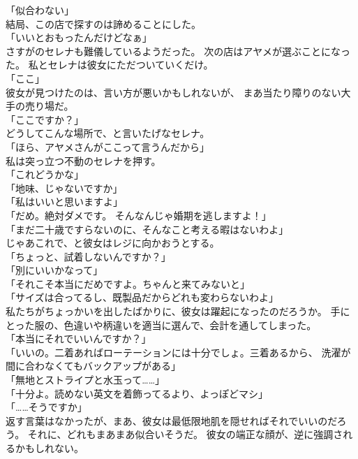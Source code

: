 \documentclass[../IHMain]{subfiles}
\begin{document}
「似合わない」\\
結局、この店で探すのは諦めることにした。\\
「いいとおもったんだけどなぁ」\\
さすがのセレナも難儀しているようだった。
次の店はアヤメが選ぶことになった。
私とセレナは彼女にただついていくだけ。\\
「ここ」\\
彼女が見つけたのは、言い方が悪いかもしれないが、
まあ当たり障りのない大手の売り場だ。\\
「ここですか？」\\
どうしてこんな場所で、と言いたげなセレナ。\\
「ほら、アヤメさんがここって言うんだから」\\
私は突っ立つ不動のセレナを押す。\\
「これどうかな」\\
「地味、じゃないですか」\\
「私はいいと思いますよ」\\
「だめ。絶対ダメです。
そんなんじゃ婚期を逃しますよ！」\\
「まだ二十歳ですらないのに、そんなこと考える暇はないわよ」\\
じゃあこれで、と彼女はレジに向かおうとする。\\
「ちょっと、試着しないんですか？」\\
「別にいいかなって」\\
「それこそ本当にだめですよ。ちゃんと来てみないと」\\
「サイズは合ってるし、既製品だからどれも変わらないわよ」\\
私たちがちょっかいを出したばかりに、彼女は躍起になったのだろうか。
手にとった服の、色違いや柄違いを適当に選んで、会計を通してしまった。\\
「本当にそれでいいんですか？」\\
「いいの。二着あればローテーションには十分でしょ。三着あるから、
洗濯が間に合わなくてもバックアップがある」\\
「無地とストライプと水玉って……」\\
「十分よ。読めない英文を着飾ってるより、よっぽどマシ」\\
「……そうですか」\\
返す言葉はなかったが、まあ、彼女は最低限地肌を隠せればそれでいいのだろう。
それに、どれもまあまあ似合いそうだ。
彼女の端正な顔が、逆に強調されるかもしれない。
\end{document}
